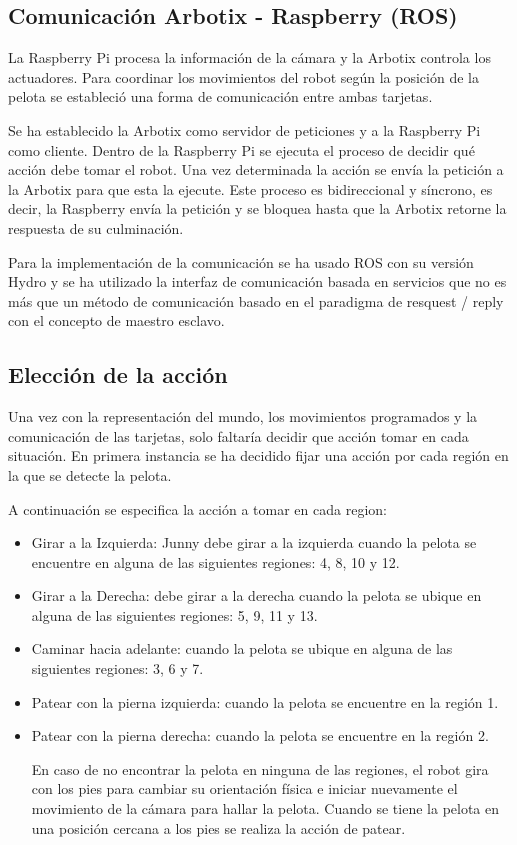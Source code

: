 \subsection{Comunicación Arbotix - Raspberry (ROS)}\label{comunicacion}

La Raspberry Pi procesa la información de la cámara y la Arbotix controla los actuadores. Para coordinar los movimientos del robot según la posición de la pelota se estableció una forma de comunicación entre ambas tarjetas. 

Se ha establecido la Arbotix como servidor de peticiones y a la Raspberry Pi como cliente. Dentro de la Raspberry Pi se ejecuta el proceso de decidir qué acción debe tomar el robot. Una vez determinada la acción se envía la petición a la Arbotix para que esta la ejecute. Este proceso es bidireccional y síncrono, es decir, la Raspberry envía la petición y se bloquea hasta que la Arbotix retorne la respuesta de su culminación.  

Para la implementación de la comunicación se ha usado ROS con su versión Hydro y se ha utilizado la interfaz de comunicación basada en servicios que no es más que un método de comunicación basado en el paradigma de resquest / reply con el concepto de maestro esclavo.

\subsection{Elecci\'on de la acci\'on}\label{eleccionAccionesFijas}

Una vez con la representaci\'on del mundo, los movimientos programados y la comunicaci\'on de las tarjetas, solo faltaría decidir que acci\'on tomar en cada situación. En primera instancia se ha decidido fijar una acción por cada región en la que se detecte la pelota. 

A continuación se especifica la acción a tomar en cada region: 
 \begin{itemize}
\item Girar a la Izquierda: Junny debe girar a la izquierda cuando la pelota se encuentre en alguna de las siguientes regiones: 4, 8, 10 y 12.

\item Girar a la Derecha: debe girar a la derecha cuando la pelota se ubique en alguna de las siguientes regiones: 5, 9, 11 y 13. 

\item Caminar hacia adelante: cuando la pelota se ubique en alguna de las siguientes regiones: 3, 6 y 7.

\item Patear con la pierna izquierda: cuando la pelota se encuentre en la región 1.

\item Patear con la pierna derecha: cuando la pelota se encuentre en la región 2.

En caso de no encontrar la pelota en ninguna de las regiones, el robot gira con los pies para cambiar su orientación física e iniciar nuevamente el movimiento de la cámara para hallar la pelota. Cuando se tiene la pelota en una posición cercana a los pies se realiza la acción de patear.
\end{itemize}